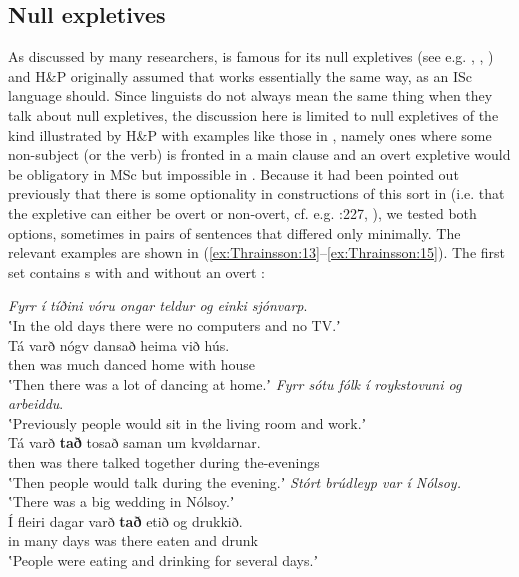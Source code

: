 \documentclass[output=paper]{LSP/langsci}
\begin{document}
\subsection{Null expletives}

As discussed by many researchers,  is famous for its null expletives (see e.g. \citealt[477--484]{Thráinsson1979}, \citealt[309--313]{Thráinsson2007}, \citealt[Chapter 6.3]{Sigurðsson1989}) and H{\&}P originally assumed that  works essentially the same way, as an ISc language should. Since linguists do not always mean the same thing when they talk about null expletives, the discussion here is limited to null expletives of the kind illustrated by H{\&}P with examples like those in , namely ones where some non-subject (or the  verb) is fronted in a main clause and an overt expletive would be obligatory in MSc but impossible in . Because it had been pointed out previously that there is some optionality in constructions of this sort in  (i.e. that the expletive can either be overt or non-overt, cf. e.g. \citealt{Vikner1995}:227, \citealt[285--288]{Thráinsson2012}), we tested both options, sometimes in pairs of sentences that differed only minimally. The relevant examples are shown in (\ref{ex:Thrainsson:13}--\ref{ex:Thrainsson:15}). The first set contains s with and without an overt :

\ea%
    \label{ex:Thrainsson:13}
    \ea \textit{Fyrr í tíðini vóru ongar teldur og einki sjónvarp}.\\
	\glt    ʽIn the old days there were no computers and no TV.ʼ\\
	\gll    Tá   varð   nógv   dansað   heima   við   hús.  \\
	        then  was  much  danced  home    with   house\\
    \glt    ʽThen there was a lot of dancing at home.ʼ
	\ex \textit{Fyrr sótu fólk í roykstovuni og arbeiddu}.\\
	\glt	ʽPreviously people would sit in the living room and work.ʼ\\
	\gll	Tá   varð   \textbf{tað}   tosað   saman   um     kvøldarnar.  \\
			then   was   there   talked together   during   the-evenings    \\
	\glt 	ʽThen people would talk during the evening.ʼ
	\ex	\textit{Stórt brúdleyp var í Nólsoy.}\\
	\glt ʽThere was a big wedding in Nólsoy.ʼ\\
	\gll	Í   fleiri   dagar varð   \textbf{tað} etið   og     drukkið.  \\
			in  many  days  was  there  eaten  and  drunk\\
	\glt	ʽPeople were eating and drinking for several days.ʼ
\z
\z
\end{document}
